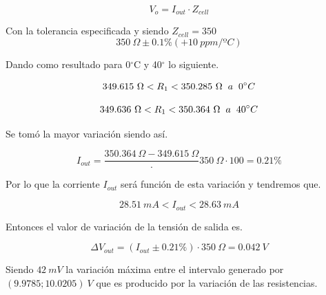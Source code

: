 \documentclass[12pt,A4paper,titlepage]{article}
\begin{document}
\bigskip
\begin{equation}
    V_o = I_{out} \cdot Z_{cell}
\end{equation}

\bigskip
\hspace{1mm} Con la tolerancia especificada y siendo \(Z_{cell}=350\)
\bigskip
\begin{equation}
    350~\Omega \pm 0.1\% (+10~ppm /ºC)
\end{equation}

\bigskip
\hspace{1mm} Dando como resultado para 0\(^\circ \)C y 40\(^\circ\) lo siguiente.
 
\bigskip
\begin{equation}
    349.615~\Omega < R_1 < 350.285~\Omega \hspace{2mm} a \hspace{2mm} 0^\circ C
\end{equation}

\begin{equation}
    349.636~\Omega < R_1 < 350.364~\Omega\hspace{2mm} a\hspace{2mm} 40^\circ C
\end{equation}

\bigskip
\hspace{1mm} Se tomó la mayor variación siendo así.

\bigskip
\begin{equation}
    I_{out}=\frac{350.364~\Omega-349.615~\Omega} \cdot {350~\Omega} \cdot 100=0.21\%
\end{equation}

\bigskip
\hspace{1mm} Por lo que la corriente \(I_{out}\) será función de esta variación y tendremos que.

\begin{equation}
    28.51~mA < I_{out} < 28.63~mA
\end{equation}

\bigskip
\hspace{1mm} Entonces el valor de variación de la tensión de salida es.

\bigskip
\begin{equation}
    \Delta V_{out} = (I_{out} \pm 0.21\%) \cdot 350~\Omega = 0.042~V
\end{equation}

\bigskip
\hspace{1mm} Siendo \(42~mV\) la variación máxima entre el intervalo generado por \( (9.9785 ; 10.0205)~V \) que es producido por la variación de las resistencias.
\end{document}
